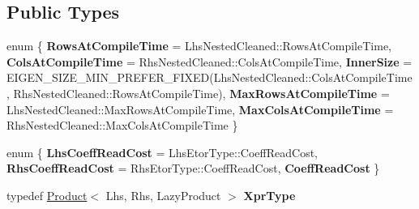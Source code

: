 \subsection*{Public Types}
\begin{DoxyCompactItemize}
\item 
\mbox{\label{struct_eigen_1_1internal_1_1product__evaluator_3_01_product_3_01_lhs_00_01_rhs_00_01_lazy_produc1ed1c0c8715953d10d735722e273406b_ad6bef645b1e738ba5b3e443b23175358}} 
enum \{ \newline
{\bfseries Rows\+At\+Compile\+Time} = Lhs\+Nested\+Cleaned\+::Rows\+At\+Compile\+Time, 
{\bfseries Cols\+At\+Compile\+Time} = Rhs\+Nested\+Cleaned\+::Cols\+At\+Compile\+Time, 
{\bfseries Inner\+Size} = E\+I\+G\+E\+N\+\_\+\+S\+I\+Z\+E\+\_\+\+M\+I\+N\+\_\+\+P\+R\+E\+F\+E\+R\+\_\+\+F\+I\+X\+ED(Lhs\+Nested\+Cleaned\+::Cols\+At\+Compile\+Time, Rhs\+Nested\+Cleaned\+::Rows\+At\+Compile\+Time), 
{\bfseries Max\+Rows\+At\+Compile\+Time} = Lhs\+Nested\+Cleaned\+::Max\+Rows\+At\+Compile\+Time, 
\newline
{\bfseries Max\+Cols\+At\+Compile\+Time} = Rhs\+Nested\+Cleaned\+::Max\+Cols\+At\+Compile\+Time
 \}
\item 
\mbox{\label{struct_eigen_1_1internal_1_1product__evaluator_3_01_product_3_01_lhs_00_01_rhs_00_01_lazy_produc1ed1c0c8715953d10d735722e273406b_a4c0cde1d93daccc02ce916cd7df9496a}} 
enum \{ {\bfseries Lhs\+Coeff\+Read\+Cost} = Lhs\+Etor\+Type\+::Coeff\+Read\+Cost, 
{\bfseries Rhs\+Coeff\+Read\+Cost} = Rhs\+Etor\+Type\+::Coeff\+Read\+Cost, 
{\bfseries Coeff\+Read\+Cost}
 \}
\item 
\mbox{\label{struct_eigen_1_1internal_1_1product__evaluator_3_01_product_3_01_lhs_00_01_rhs_00_01_lazy_produc1ed1c0c8715953d10d735722e273406b_aa88b376d10e426ee3fe56c8689eccd92}} 
typedef \mbox{\hyperlink{class_eigen_1_1_product}{Product}}$<$ Lhs, Rhs, Lazy\+Product $>$ {\bfseries Xpr\+Type}
\item 
\mbox{\label{struct_eigen_1_1internal_1_1product__evaluator_3_01_product_3_01_lhs_00_01_rhs_00_01_lazy_produc1ed1c0c8715953d10d735722e273406b_a8f3c8fded50cda1eae44225eea717a97}} 

\end{DoxyCompactItemize}
